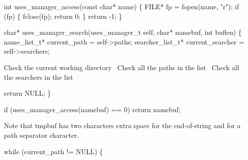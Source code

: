 \nwenddocs{}\plusendmoddef\nwstartdeflinemarkup{}\nwenddeflinemarkup
int uses_manager_access(const char* name)
\{
    FILE* fp = fopen(name, "r");
    if (fp) \{
        fclose(fp);
        return 0;
    \}
    return -1;
\}

\nwendcode{}\nwdocspar

\nwenddocs{}\plusendmoddef\nwstartdeflinemarkup{}\nwenddeflinemarkup
char* uses_manager_search(uses_manager_t self, char* namebuf,
                                  int buflen)
\{
    name_list_t* current_path = self->paths;
    searcher_list_t* current_searcher = self->searchers;

    \LA{}Check the current working directory~{\nwtagstyle{}}\RA{}
    \LA{}Check all the paths in the list~{\nwtagstyle{}}\RA{}
    \LA{}Check all the searchers in the list~{\nwtagstyle{}}\RA{}

    return NULL;
\}

\nwendcode{}\nwdocspar

\nwenddocs{}\endmoddef\nwstartdeflinemarkup{}\nwenddeflinemarkup
if (uses_manager_access(namebuf) == 0)
    return namebuf;
\nwendcode{}\nwdocspar

Note that {\Tt{}tmpbuf\nwendquote} has two characters extra space for the end-of-string
and for a path separator character.

\nwenddocs{}\endmoddef\nwstartdeflinemarkup{}\nwenddeflinemarkup
while (current_path != NULL) \{

